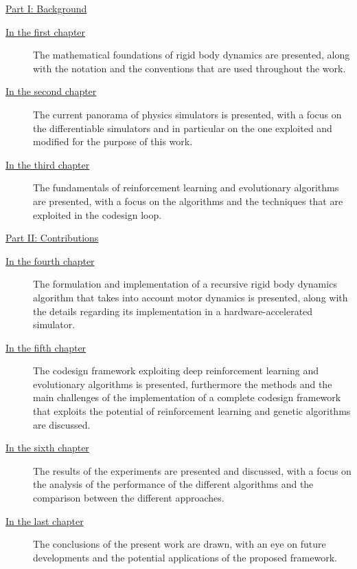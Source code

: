 \begin{description}

    \item{\hyperref[part:background]{Part I: Background}}

          \begin{description}
              \item[{\hyperref[chp:back_RBDynamics]{In the first chapter}}] The mathematical foundations of rigid body dynamics are presented, along with the notation and the conventions that are used throughout the work.
              \item[{\hyperref[chp:back_PhysicsSimulators]{In the second chapter}}] The current panorama of physics simulators is presented, with a focus on the differentiable simulators and in particular on the one exploited and modified for the purpose of this work.
              \item [{\hyperref[chp:back_RLGA]{In the third chapter}}] The fundamentals of reinforcement learning and evolutionary algorithms are presented, with a focus on the algorithms and the techniques that are exploited in the codesign loop.
          \end{description}

    \item{\hyperref[part:contributions]{Part II: Contributions}}

          \begin{description}
              \item[{\hyperref[chp:contrib_ABA]{In the fourth chapter}}] The formulation and implementation of a recursive rigid body dynamics algorithm that takes into account motor dynamics is presented, along with the details regarding its implementation in a hardware-accelerated simulator.
              \item[{\hyperref[chp:contrib_CodesignRL]{In the fifth chapter}}] The codesign framework exploiting deep reinforcement learning and evolutionary algorithms is presented, furthermore the methods and the main challenges of the implementation of a complete codesign framework that exploits the potential of reinforcement learning and genetic algorithms are discussed.
              \item[{\hyperref[chp:contrib_ResultsDiscussion]{In the sixth chapter}}] The results of the experiments are presented and discussed, with a focus on the analysis of the performance of the different algorithms and the comparison between the different approaches.
              \item[{\hyperref[chp:contrib_Conclusions]{In the last chapter}}] The conclusions of the present work are drawn, with an eye on future developments and the potential applications of the proposed framework.
          \end{description}
\end{description}
